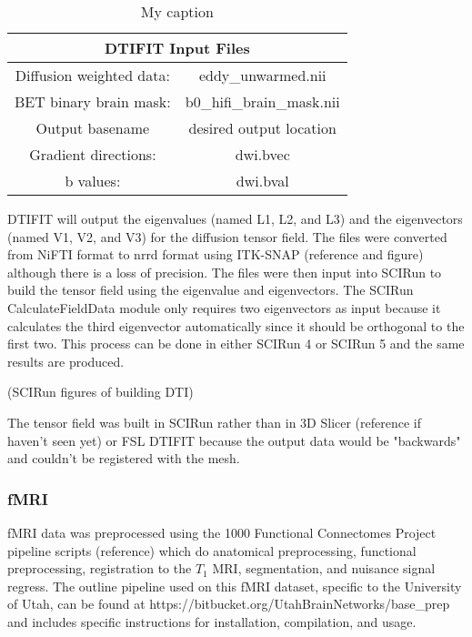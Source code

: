 \begin{table}[]
\centering
\caption{My caption}
\label{dtifit}
\begin{tabular}{|c|c|}
\hline
\multicolumn{2}{|c|}{DTIFIT Input Files}             \\ \hline
Diffusion weighted data: & eddy\_unwarmed.nii        \\ \hline
BET binary brain mask:   & b0\_hifi\_brain\_mask.nii \\ \hline
Output basename          & desired output location   \\ \hline
Gradient directions:     & dwi.bvec                  \\ \hline
b values:                & dwi.bval                  \\ \hline
\end{tabular}
\end{table}

DTIFIT will output the eigenvalues (named L1, L2, and L3) and the eigenvectors (named V1, V2, and V3) for the diffusion tensor field. The files were converted from NiFTI format to nrrd format using ITK-SNAP (reference and figure) although there is a loss of precision. The files were then input into SCIRun to build the tensor field using the eigenvalue and eigenvectors. The SCIRun CalculateFieldData module only requires two eigenvectors as input because it calculates the third eigenvector automatically since it should be orthogonal to the first two. This process can be done in either SCIRun 4 or SCIRun 5 and the same results are produced. 

(SCIRun figures of building DTI) 

The tensor field was built in SCIRun rather than in 3D Slicer (reference if haven't seen yet) or FSL DTIFIT because the output data would be "backwards" and couldn't be registered with the mesh. 

\subsubsection{fMRI}
\label{sec:fmripre}

fMRI data was preprocessed using the 1000 Functional Connectomes Project pipeline scripts (reference) which do anatomical preprocessing, functional preprocessing, registration to the $T_1$ MRI, segmentation, and nuisance signal regress. The outline pipeline used on this fMRI dataset, specific to the University of Utah, can be found at https://bitbucket.org/UtahBrainNetworks/base\_prep and includes specific instructions for installation, compilation, and usage.  

